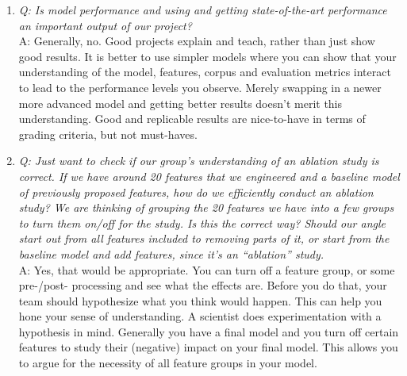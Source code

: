 \documentclass[11pt]{article}
\begin{document}
\begin{enumerate}
    {\bf Coffee / Tea Break} experiments test those runs from the Immediate scale that reach your standard for trying on a larger dataset.  These experiments can be set to run on a server with a medium-sized dataset that can complete independently while you are eating a meal, or taking a break to do other work or play.  These validate your ideas on larger scale datasets without committing to training an entire dataset without knowing whether the results point appropriately in the proper direction – Min has seen many times that the "math works out  (e.g., shape of matrices are fine) but which the computation is garbage (e.g., one off indexing errors) – so this scale mitigates this.  These scale experiments need to be followed up with analysis to ensure that the results are as expected and appropriate.

    {\bf Overnight} (or longer) experimentation runs your training or testing at scale, for production or for final presentations or reports.  Try not to do this scale of experimentation without having a good reason to believe it will succeed (i.e., don't run a large-scale experiment to try something out; you should have done that at the Coffee / Tea Break scale instead).

    \item {\it Q: Is model performance and using and getting state-of-the-art performance an important output of our project?}\\
    A: Generally, no.  Good projects explain and teach, rather than just show good results.  It is better to use simpler models where you can show that your understanding of the model, features, corpus and evaluation metrics interact to lead to the performance levels you observe.  Merely swapping in a newer more advanced model and getting better results doesn't merit this understanding.  Good and replicable results are nice-to-have in terms of grading criteria, but not must-haves.

    \item {\it Q: Just want to check if our group’s understanding of an ablation study is correct.  If we have around 20 features that we engineered and a baseline model of previously proposed features, how do we efficiently conduct an ablation study?  We are thinking of grouping the 20 features we have into a few groups to turn them on/off for the study. Is this the correct way? Should our angle start out from all features included to removing parts of it, or start from the baseline model and add features, since it's an ``ablation'' study.} \\
    A: Yes, that would be appropriate. You can turn off a feature group, or some pre-/post- processing and see what the effects are. Before you do that, your team should hypothesize what you think would happen. This can help you hone your sense of understanding. A scientist does experimentation with a hypothesis in mind.  Generally you have a final model and you turn off certain features to study their (negative) impact on your final model. This allows you to argue for the necessity of all feature groups in your model.


\end{enumerate}
\end{document}
